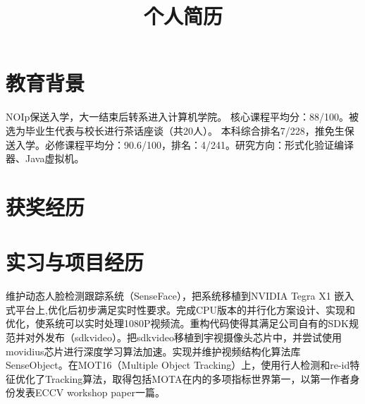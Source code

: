 \documentclass[11pt,a4paper]{moderncv}
\title{个人简历}               %
\begin{document}
\maketitle

\section{教育背景}
{NOIp保送入学，大一结束后转系进入计算机学院。}
{核心课程平均分：88/100。被选为毕业生代表与校长进行茶话座谈（共20人）。}
{本科综合排名7/228，推免生保送入学。必修课程平均分：90.6/100，排名：4/241。研究方向：形式化验证编译器、Java虚拟机。}
\section{获奖经历}
\section{实习与项目经历}
{维护动态人脸检测跟踪系统（SenseFace），把系统移植到NVIDIA Tegra X1 嵌入式平台上,优化后初步满足实时性要求。完成CPU版本的并行化方案设计、实现和优化，使系统可以实时处理1080P视频流。重构代码使得其满足公司自有的SDK规范并对外发布（sdkvideo）。把sdkvideo移植到宇视摄像头芯片中，并尝试使用movidius芯片进行深度学习算法加速。实现并维护视频结构化算法库SenseObject。在MOT16（Multiple Object Tracking）上，使用行人检测和re-id特征优化了Tracking算法，取得包括MOTA在内的多项指标世界第一，以第一作者身份发表ECCV workshop paper一篇。}  
\end{document}
